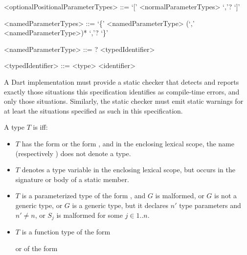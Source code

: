\documentclass[makeidx]{article}
\begin{document}
{\begin{grammar}
<optionalPositionalParameterTypes> ::= `[' <normalParameterTypes> `,'? `]'

<namedParameterTypes> ::=
  `\{' <namedParameterType> (`,' <namedParameterType>)* `,'? `\}'

<namedParameterType> ::=
  \REQUIRED{}? <typedIdentifier>

<typedIdentifier> ::= <type> <identifier>
\end{grammar}

\LMHash{}%
A Dart implementation must provide a static checker that detects and reports
exactly those situations this specification identifies as compile-time errors,
and only those situations.
Similarly, the static checker must emit static warnings
for at least the situations specified as such in this specification.


\LMHash{}%
A type $T$ is  if{}f:
\begin{itemize}
\item
  $T$ has the form \id{} or the form ,
  and in the enclosing lexical scope,
  the name \id{} (respectively )
  does not denote a type.
\item
  $T$ denotes a type variable in the enclosing lexical scope,
  but occurs in the signature or body of a static member.
\item
  $T$ is a parameterized type of the form ,
  and $G$ is malformed,
  or $G$ is not a generic type,
  or $G$ is a generic type,
  but it declares $n'$ type parameters and $n' \not= n$,
  or $S_j$ is malformed for some $j \in 1 .. n$.
\item
  $T$ is a function type of the form



  \noindent
  or of the form



\end{itemize}}
\end{document}
